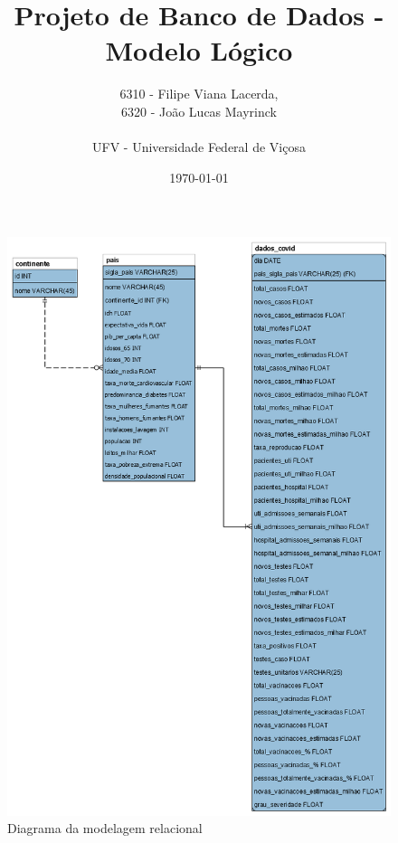 \documentclass{article}
\title{Projeto de Banco de Dados - Modelo Lógico}
\author{6310 - Filipe Viana Lacerda,\\6320 - João Lucas Mayrinck\\\\ \small{UFV - Universidade Federal de Viçosa}}
\date{\today}
\begin{document}
    \maketitle

    \begin{figure}
        
        \centering
        \includegraphics[scale=0.45]{MLR-semFundo.png}
        \caption{Diagrama da modelagem relacional}

    \end{figure}
    
\end{document}
